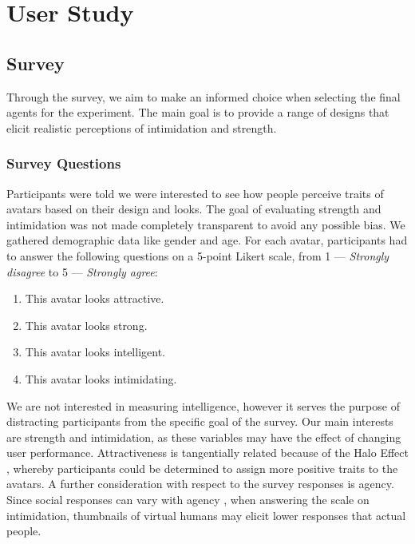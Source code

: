 \section{User Study}
\subsection{Survey}
\label{section:survey}
Through the survey, we aim to make an informed choice when selecting the final agents for the experiment. The main goal is to provide a range of designs that elicit realistic perceptions of intimidation and strength.

\subsubsection{Survey Questions}
Participants were told we were interested to see how people perceive traits of avatars based on their design and looks. The goal of evaluating strength and intimidation was not made completely transparent to avoid any possible bias. We gathered demographic data like gender and age. For each avatar, participants had to answer the following questions on a 5-point Likert scale, from 1 --- \textit{Strongly disagree} to 5 --- \textit{Strongly agree}:
\begin{enumerate}
\itemsep0em 
\item This avatar looks attractive.
\item This avatar looks strong.
\item This avatar looks intelligent.
\item This avatar looks intimidating.
\end{enumerate}
We are not interested in measuring intelligence, however it serves the purpose of distracting participants from the specific goal of the survey. Our main interests are strength and intimidation, as these variables may have the effect of changing user performance. Attractiveness is tangentially related because of the Halo Effect \cite{nisbett1977halo}, whereby participants could be determined to assign more positive traits to the avatars. A further consideration with respect to the survey responses is agency. Since social responses can vary with agency \cite{fox2015avatars}, when answering the scale on intimidation, thumbnails of virtual humans may elicit lower responses that actual people.
 
